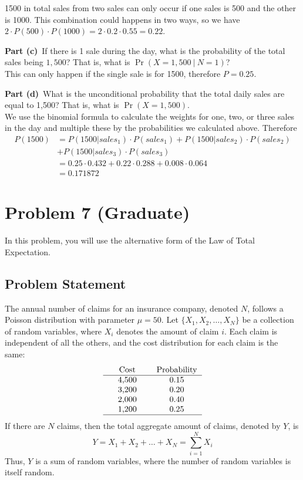 \documentclass[12pt]{article}
\theoremstyle{definition}
\begin{document}
1500 in total sales from two sales can only occur if one sales is 500 and the other is 1000. This combination could happens in two ways, so we have $2\cdot P(500)\cdot P(1000) = 2\cdot 0.2 \cdot 0.55 = 0.22$.

\newpage
\noindent
{\bf Part (c)}\ If there is 1 sale during the day, what is the probability of the total sales being $1,500$? That is, what is $\Pr(X = 1,500\ |\ N = 1)$?\\

This can only happen if the single sale is for 1500, therefore $P = 0.25$.


\vspace{3in}
\noindent
{\bf Part (d)}\ What is the unconditional probability that the total daily sales are equal to 1,500? That is, what is $\Pr(X = 1,500)$.\\

We use the binomial formula to calculate the weights for one, two, or three sales in the day and multiple these by the probabilities we calculated above. Therefore
\begin{align*}
P(1500) &= P(1500|sales_1)\cdot P(sales_1) + P(1500|sales_2)\cdot P(sales_2)\\
&+ P(1500|sales_3)\cdot P(sales_3)\\
&= 0.25 \cdot 0.432 + 0.22 \cdot 0.288 + 0.008\cdot 0.064\\
&= 0.171872
\end{align*}

\newpage
\section*{Problem 7 (Graduate)}

In this problem, you will use the alternative form of the Law of Total Expectation.

\subsection*{Problem Statement}

The annual number of claims for an insurance company, denoted $N$, follows a Poisson distribution with parameter $\mu = 50$. Let $\{X_1, X_2, \ldots, X_N\}$ be a collection of random variables, where $X_i$ denotes the amount of claim $i$. Each claim is independent of all the others, and the cost distribution for each claim is the same:
$$
\begin{tabular}{ccccc}
& Cost & & Probability\\
\hline
& 4,500 & & 0.15\\
& 3,200 & & 0.20\\
& 2,000 & & 0.40\\
& 1,200 & & 0.25\\
\hline
\end{tabular}
$$
If there are $N$ claims, then the total aggregate amount of claims, denoted by $Y$, is
$$
Y = X_1 + X_2 + \ldots + X_N = \sum_{i=1}^N X_i
$$
Thus, $Y$ is a sum of random variables, where the number of random variables is itself random.
\end{document}
